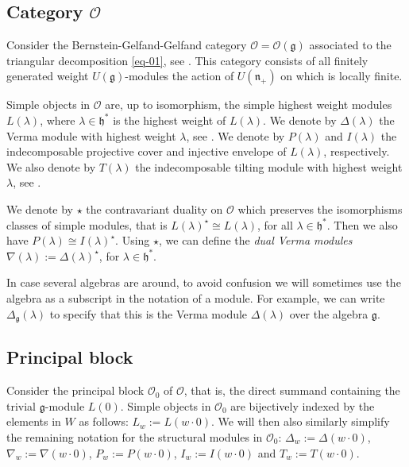 \documentclass[a4paper]{amsart}
\begin{document}
\subsection{Category $\mathcal{O}$}\label{s1.2}

Consider the Bernstein-Gelfand-Gelfand category 
$\mathcal{O}=\mathcal{O}(\mathfrak{g})$
associated to the triangular decomposition
\eqref{eq-01}, see \cite{BGG,Hu}. This category consists of all
finitely generated weight $U(\mathfrak{g})$-modules the action of 
$U(\mathfrak{n}_+)$ on which is locally finite.

Simple objects in $\mathcal{O}$ are, up to isomorphism, 
the simple highest weight modules $L(\lambda)$, where
$\lambda\in\mathfrak{h}^*$ is the highest weight of
$L(\lambda)$. We denote by $\Delta(\lambda)$ the Verma
module with highest weight $\lambda$, see \cite{Di,Hu}.
We denote by $P(\lambda)$ and $I(\lambda)$ the 
indecomposable projective cover and injective envelope
of $L(\lambda)$, respectively. We also denote by
$T(\lambda)$ the indecomposable tilting module with 
highest weight $\lambda$, see \cite{CI,Ri,Hu}.

We denote by $\star$ the contravariant duality on
$\mathcal{O}$ which preserves the isomorphisms classes of
simple modules, that is $L(\lambda)^\star\cong L(\lambda)$,
for all $\lambda\in\mathfrak{h}^*$. Then we also have
$P(\lambda)\cong I(\lambda)^\star$. Using $\star$,
we can define the {\em dual Verma modules}
$\nabla(\lambda):=\Delta(\lambda)^\star$, 
for $\lambda\in\mathfrak{h}^*$. 

In case several algebras are around, to avoid confusion we will
sometimes use the algebra as a subscript in the notation of 
a module. For example, we can write $\Delta_\mathfrak{g}(\lambda)$
to specify that this is the Verma module $\Delta(\lambda)$
over the algebra $\mathfrak{g}$.

\subsection{Principal block}\label{s1.3}

Consider the principal block $\mathcal{O}_0$ of 
$\mathcal{O}$, that is, the direct summand containing the
trivial $\mathfrak{g}$-module $L(0)$. Simple objects
in $\mathcal{O}_0$ are bijectively indexed by
the elements in $W$ as follows: $L_w:=L(w\cdot 0)$.
We will then also similarly simplify the remaining notation
for the structural modules in $\mathcal{O}_0$:
$\Delta_w:=\Delta(w\cdot 0)$, $\nabla_w:=\nabla(w\cdot 0)$, 
$P_w:=P(w\cdot 0)$, $I_w:=I(w\cdot 0)$ and $T_w:=T(w\cdot 0)$.
\end{document}
